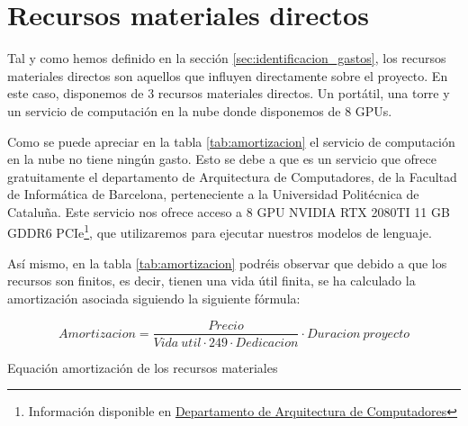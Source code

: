 \section{Recursos materiales directos}
\label{sec:recursos_directos}


Tal y como hemos definido en la sección \ref{sec:identificacion_gastos}, los recursos materiales directos son aquellos que influyen directamente sobre el
proyecto. En este caso, disponemos de 3 recursos materiales directos. Un portátil, una torre y un servicio de computación en la nube donde disponemos de 8 GPUs.

Como se puede apreciar en la tabla \ref{tab:amortizacion} el servicio de computación en la nube no tiene ningún gasto. Esto se debe a que es un servicio que ofrece
gratuitamente el departamento de Arquitectura de Computadores, de la Facultad de Informática de Barcelona, perteneciente a la Universidad Politécnica de Cataluña.
Este servicio nos ofrece acceso a 8 GPU NVIDIA RTX 2080TI 11 GB GDDR6 PCIe\footnote{Información disponible en \href{https://www.ac.upc.edu/ca/nosaltres/serveis-tic/blog/nou-node-amb-gpus-al-cluster-sert}{Departamento de Arquitectura de Computadores}},
que utilizaremos para ejecutar nuestros modelos de lenguaje.

Así mismo, en la tabla \ref{tab:amortizacion} podréis observar que debido a que los recursos son finitos, es decir, tienen una vida útil finita, se ha calculado la
amortización asociada siguiendo la siguiente fórmula:

\begin{myequation}[h]
    \begin{equation}
        Amortizacion= \frac{Precio}{Vida\ util \cdot 249\cdot Dedicacion}\cdot Duracion\ proyecto
    \label{ec:ec1}
    \end{equation}
    \caption{Equación amortización de los recursos materiales}
\end{myequation} 

